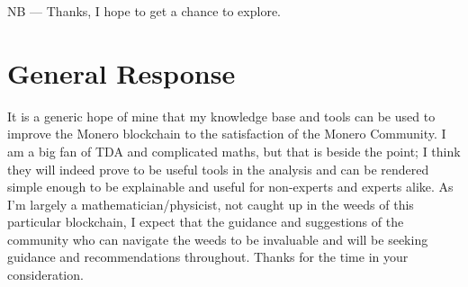 \documentclass[prc, 12pt]{revtex4-1}
\begin{document}
NB --- Thanks, I hope to get a chance to explore.

\section{General Response}

It is a generic hope of mine that my knowledge base and tools can be used to improve the Monero blockchain to the satisfaction of the Monero Community.  I am a big fan of TDA and complicated maths, but that is beside the point; I think they will indeed prove to be useful tools in the analysis and can be rendered simple enough to be explainable and useful for non-experts and experts alike.  As I'm largely a mathematician/physicist, not caught up in the weeds of this particular blockchain, I expect that the guidance and suggestions of the community who can navigate the weeds to be invaluable and will be seeking guidance and recommendations throughout.  Thanks for the time in your consideration.

  


\end{document}
